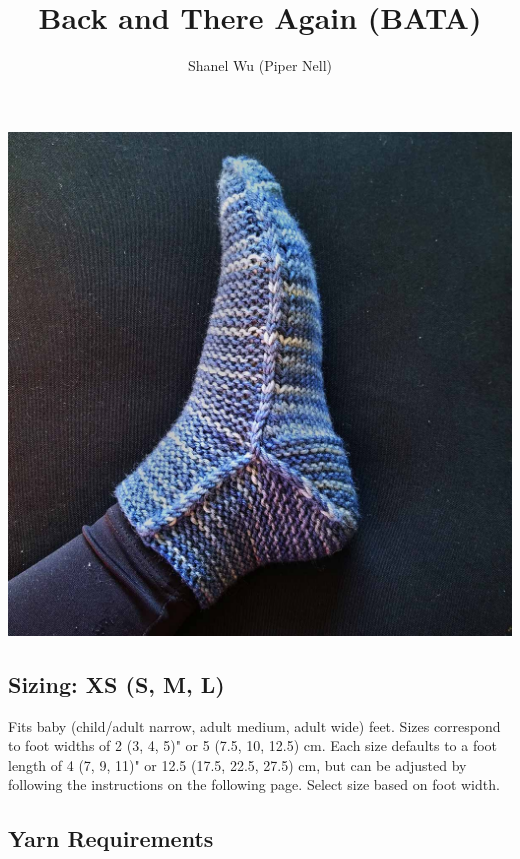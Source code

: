 \documentclass[12pt]{article}
\title{Back and There Again (BATA)} %
\author{Shanel Wu (Piper Nell)}
\begin{document}


{\selectfont
\HUGE\textbf{\thetitle}
\hspace{2em} %
\normalsize\theauthor
}

\begin{multicols}{2}

\includegraphics[width=\linewidth]{Photos/smallVersions/BATA_L}

\small
\subsection*{Sizing: XS (S, M, L)}

Fits baby (child/adult narrow, adult medium, adult wide) feet. Sizes correspond to foot widths of 2 (3, 4, 5)" or 5 (7.5, 10, 12.5) cm. Each size defaults to a foot length of 4 (7, 9, 11)" or 12.5 (17.5, 22.5, 27.5) cm, but can be adjusted by following the instructions on the following page. Select size based on foot width.

\subsection*{Yarn Requirements}


\end{multicols}
\end{document}
